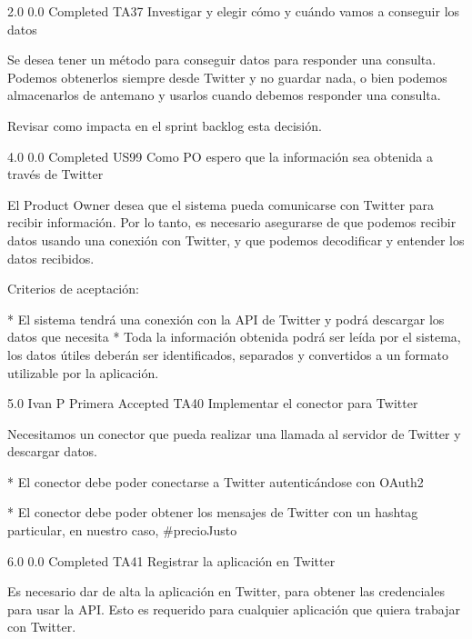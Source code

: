 		{2.0} %
		{} %
		{0.0} %
		{Completed} %
	\task
		{TA37} %
		{Investigar y elegir cómo y cuándo vamos a conseguir los datos} %
		{Se desea tener un método para conseguir datos para responder una consulta.
Podemos obtenerlos siempre desde Twitter y no guardar nada, o bien podemos
almacenarlos de antemano y usarlos cuando debemos responder una consulta.

Revisar como impacta en el sprint backlog esta decisión.

} %
		{4.0} %
		{} %
		{0.0} %
		{Completed} %
\userStory
	{US99} %
	{Como PO espero que la información sea obtenida a través de Twitter} %
	{El Product Owner desea que el sistema pueda comunicarse con Twitter para
recibir información. Por lo tanto, es necesario asegurarse de que podemos
recibir datos usando una conexión con Twitter, y que podemos decodificar y
entender los datos recibidos.

  
Criterios de aceptación:

* El sistema tendrá una conexión con la API de Twitter y podrá descargar los datos que necesita  
* Toda la información obtenida podrá ser leída por el sistema, los datos útiles deberán ser identificados, separados y convertidos a un formato utilizable por la aplicación.

} %
	{} %
	{5.0} %
	{Ivan P} %
	{Primera} %
	{Accepted} %
	\task
		{TA40} %
		{Implementar el conector para Twitter} %
		{Necesitamos un conector que pueda realizar una llamada al servidor de Twitter
y descargar datos.

* El conector debe poder conectarse a Twitter autenticándose con OAuth2

* El conector debe poder obtener los mensajes de Twitter con un hashtag particular, en nuestro caso, #precioJusto

} %
		{6.0} %
		{} %
		{0.0} %
		{Completed} %
	\task
		{TA41} %
		{Registrar la aplicación en Twitter} %
		{Es necesario dar de alta la aplicación en Twitter, para obtener las
credenciales para usar la API. Esto es requerido para cualquier aplicación que
quiera trabajar con Twitter.

} %

